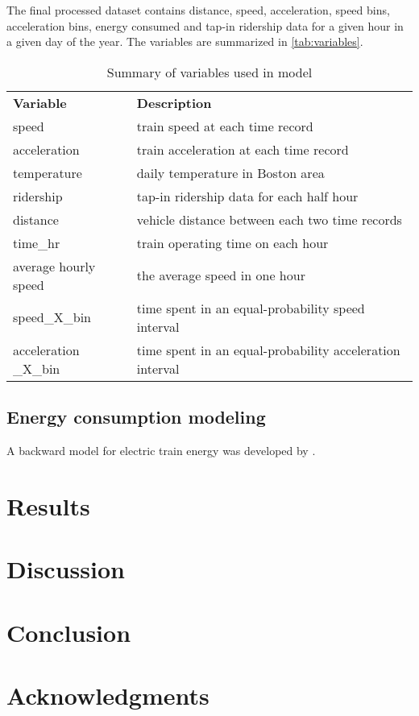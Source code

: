 \documentclass[preprint, 11pt]{elsarticle}
\newcommand{\?}{\stackrel{?}{=}}
\begin{document}
The final processed dataset contains distance, speed, acceleration, speed bins, acceleration bins, energy consumed and tap-in ridership data for a given hour in a given day of the year.
The variables are summarized in \autoref{tab:variables}.

\begin{table}[ht]\footnotesize
    \centering
    \begin{tabular}{l l}\toprule
        \bf Variable & \bf Description \\
       speed  &  train speed at each time record \\
       acceleration  &  train acceleration at each time record \\
       temperature & daily temperature in Boston area\\
       ridership & tap-in ridership data for each half hour\\
       distance & vehicle distance between each two time records\\
       time_hr & train operating time on each hour\\
       average hourly speed & the average speed in one hour\\
       speed\_X\_bin & time spent in an equal-probability speed interval \\
       acceleration \_X\_bin & time spent in an equal-probability acceleration interval \\
       \bottomrule
    \end{tabular}
    \caption{Summary of variables used in model}
    \label{tab:variables}
\end{table}

\subsection{Energy consumption modeling}
A backward model for electric train energy was developed by \cite{wang2017electric}.

\section{Results}

\section{Discussion}

\section{Conclusion}

\section*{Acknowledgments}



\end{document}

